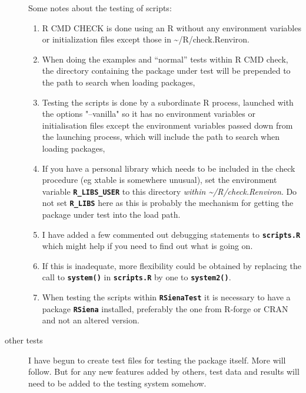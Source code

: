 \documentclass[12pt, a4paper]{article}
\renewcommand{\=}{\,=\,}
\newcommand{\+}{\,+\,}
\newcommand{\sfn}[1]{\textbf{\texttt{#1}}}
\begin{document}
\begin{description}
Some notes about the testing of scripts:
\begin{enumerate}
\item R CMD CHECK is done using an R without any
  environment variables or initialization files except those in
  \textasciitilde/R/check.Renviron.
\item When doing the examples and ``normal'' tests within R CMD check, the
  directory containing the package under test will be prepended to the path to
  search when loading packages,
\item Testing the scripts is done by a subordinate R process, launched with the
  options "--vanilla" so it has no environment variables or initialisation
  files except the environment variables passed down from the launching process,
  which will include the path to search when loading packages,
\item If you have a personal library which needs to be included in the check
  procedure (eg xtable is somewhere unusual), set the environment variable
  \sfn{R\_LIBS\_USER} to this directory \emph{within
    \textasciitilde/R/check.Renviron}. Do not set \sfn{R\_LIBS} here as this is
  probably the mechanism for getting the package under test into the load path.
\item I have added a few commented out debugging statements to \sfn{scripts.R}
  which might help if you need to find out what is going on.
\item If this is inadequate, more flexibility could be obtained by replacing
 the call to \sfn{system()} in \sfn{scripts.R} by one to \sfn{system2()}.
\item When testing the scripts within \sfn{RSienaTest} it is necessary to have a
  package \sfn{RSiena} installed, preferably the one from R-forge or CRAN and
  not an altered version.
\end{enumerate}

\item[other tests]
I have begun to create test files for testing the package itself. More will
follow. But for any new features added by others, test data and
results will need to be added to the testing system somehow.
\end{description}
\end{document}
